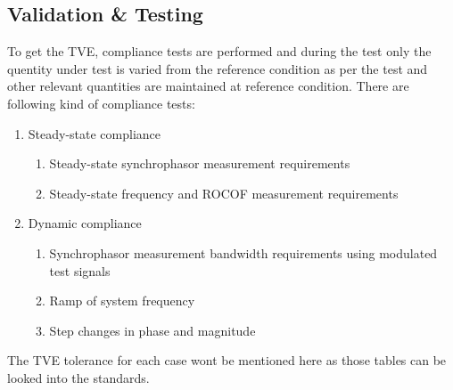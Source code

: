 \subsection{Validation \& Testing }
To get the TVE, compliance tests are performed and during the test only the quentity under test is varied from the reference condition as per the test and other relevant quantities are maintained at reference condition. There are following kind of compliance tests:
\begin{enumerate}
\item Steady-state compliance
	\begin{enumerate}
	\item Steady-state synchrophasor measurement requirements
	\item Steady-state frequency and ROCOF measurement requirements
	\end{enumerate}
\item Dynamic compliance
	\begin{enumerate}
	\item Synchrophasor measurement bandwidth requirements using modulated test signals
	\item Ramp of system frequency
	\item Step changes in phase and magnitude
	\end{enumerate}
\end{enumerate} 
The TVE tolerance for each case wont be mentioned here as those tables can be looked into the standards.
